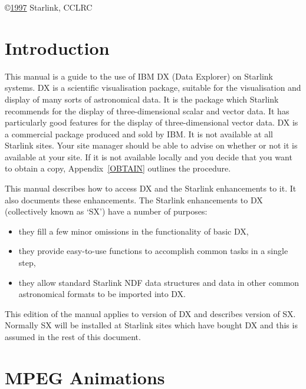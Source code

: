 \vspace{2.5cm}
\copyright \underline{1997} Starlink, CCLRC


\cleardoublepage
\renewcommand{\thepage}{\arabic{page}}
\setcounter{page}{1}

\section{Introduction  }

This manual is a guide to the use of IBM DX (Data Explorer) on
Starlink systems. DX is a scientific visualisation package, suitable
for the visualisation and display of many sorts of astronomical data.
It is the package which Starlink recommends for the display of
three-dimensional scalar and vector data. It has particularly good
features for the display of three-dimensional vector data. DX is a
commercial package produced and sold by IBM. It is not available at all
Starlink sites. Your site manager should be able to advise on whether or
not it is available at your site. If it is not available locally and you
decide that you want to obtain a copy, Appendix~\ref{OBTAIN} outlines the
procedure.

This manual describes how to access DX and the Starlink enhancements to
it. It also documents these enhancements. The Starlink enhancements to
DX (collectively known as `SX') have a number of purposes:

\begin{itemize}

  \item they fill a few minor omissions in the functionality of basic
   DX,

  \item they provide easy-to-use functions to accomplish common tasks
   in a single step,

  \item they allow standard Starlink NDF data structures and data in
   other common astronomical formats to be imported into DX.

\end{itemize}

This edition of the manual applies to version \DXversion of DX and
describes version \SXversion of SX.  Normally SX will be installed at
Starlink sites which have bought DX and this is assumed in the rest of
this document.


\section{MPEG Animations  }

